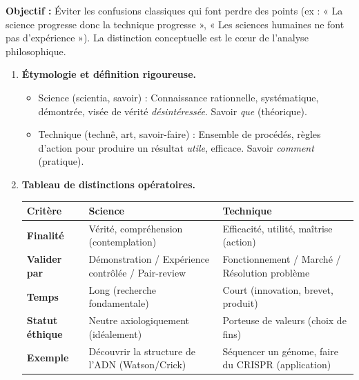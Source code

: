 \documentclass[11pt]{article}
\newcommand{\cle}[1]{{\popxbold\color{popdark}#1}}
\begin{document}
\begin{methode}
    \textbf{Objectif :} Éviter les confusions classiques qui font perdre des points (ex : « La science progresse donc la technique progresse », « Les sciences humaines ne font pas d'expérience »). La distinction conceptuelle est le cœur de l'analyse philosophique.
    \begin{enumerate}
        \item \textbf{Étymologie et définition rigoureuse.}
        \begin{itemize}
            \item \cle{Science} (scientia, savoir) : Connaissance rationnelle, systématique, démontrée, visée de vérité \emph{désintéressée}. Savoir \emph{que} (théorique).
            \item \cle{Technique} (technê, art, savoir-faire) : Ensemble de procédés, règles d'action pour produire un résultat \emph{utile}, efficace. Savoir \emph{comment} (pratique).
        \end{itemize}
        \item \textbf{Tableau de distinctions opératoires.}
        \begin{center}
            \begin{tabularx}{\linewidth}{|l|X|X|}
                \hline
                \rowcolor{popblueL}
                \textbf{Critère} & \textbf{Science} & \textbf{Technique} \\
                \hline
                \textbf{Finalité} & Vérité, compréhension (contemplation) & Efficacité, utilité, maîtrise (action) \\
                \hline
                \textbf{Valider par} & Démonstration / Expérience contrôlée / Pair-review & Fonctionnement / Marché / Résolution problème \\
                \hline
                \textbf{Temps} & Long (recherche fondamentale) & Court (innovation, brevet, produit) \\
                \hline
                \textbf{Statut éthique} & Neutre axiologiquement (idéalement) & Porteuse de valeurs (choix de fins) \\
                \hline
                \textbf{Exemple} & Découvrir la structure de l'ADN (Watson/Crick) & Séquencer un génome, faire du CRISPR (application) \\
                \hline
            \end{tabularx}

\end{center}
\end{enumerate}
\end{methode}
\end{document}
